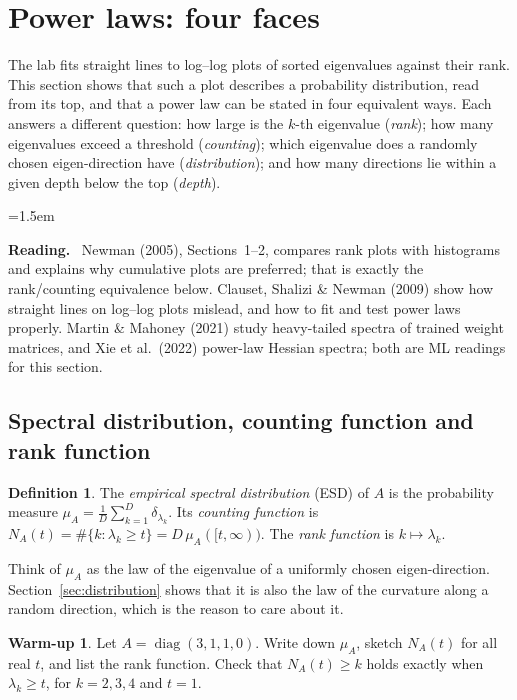\documentclass[11pt,a4paper]{article}
\DeclareMathOperator{\diag}{diag}
\theoremstyle{plain}
\theoremstyle{definition}
\newtheorem{definition}[proposition]{Definition}
\newtheorem{warmup}[proposition]{Warm-up}
\theoremstyle{remark}
\newenvironment{reading}{\begin{list}{}{\leftmargin=1.5em\rightmargin=0pt\topsep=6pt}\small\item[]%
  \textcolor{blue!50!black}{\textbf{Reading.}}\ }{\end{list}}
\begin{document}
\section{Power laws: four faces}\label{sec:faces}

The lab fits straight lines to log--log plots of sorted eigenvalues against their rank. This section shows that such
a plot describes a probability distribution, read from its top, and that a power law can be stated in four
equivalent ways. Each answers a different question: how large is the $k$-th eigenvalue (\emph{rank}); how many
eigenvalues exceed a threshold (\emph{counting}); which eigenvalue does a randomly chosen eigen-direction have
(\emph{distribution}); and how many directions lie within a given depth below the top (\emph{depth}).

\begin{reading}
Newman (2005), Sections~1--2, compares rank plots with histograms and explains why cumulative plots are preferred;
that is exactly the rank/counting equivalence below. Clauset, Shalizi \& Newman (2009) show how straight lines on
log--log plots mislead, and how to fit and test power laws properly. Martin \& Mahoney (2021) study heavy-tailed
spectra of trained weight matrices, and Xie et al.\ (2022) power-law Hessian spectra; both are ML readings for this
section.
\end{reading}

\subsection{Spectral distribution, counting function and rank function}

\begin{definition}\label{def:esd}
The \emph{empirical spectral distribution} (ESD) of $A$ is the probability measure
$\mu_A=\frac1D\sum_{k=1}^D\delta_{\lambda_k}$. Its \emph{counting function} is
$N_A(t)=\#\{k:\lambda_k\ge t\}=D\,\mu_A([t,\infty))$. The \emph{rank function} is $k\mapsto\lambda_k$.
\end{definition}

Think of $\mu_A$ as the law of the eigenvalue of a uniformly chosen eigen-direction. Section~\ref{sec:distribution}
shows that it is also the law of the curvature along a random direction, which is the reason to care about it.

\begin{warmup}\label{wu:small}
Let $A=\diag(3,1,1,0)$. Write down $\mu_A$, sketch $N_A(t)$ for all real $t$, and list the rank function. Check that
$N_A(t)\ge k$ holds exactly when $\lambda_k\ge t$, for $k=2,3,4$ and $t=1$.
\end{warmup}
\end{document}
